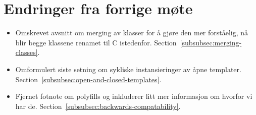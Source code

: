 
\chapter*{Endringer fra forrige møte}

\begin{itemize}
    \item Omskrevet avsnitt om merging av klasser for å gjøre den mer forståelig, nå blir begge klassene renamet til C istedenfor.
    Section~\vref{subsubsec:merging-classes}.
    \item Omformulert siste setning om sykliske instansieringer av åpne templater.
    Section~\vref{subsubsec:open-and-closed-templates}.
    \item Fjernet fotnote om polyfills og inkluderer litt mer informasjon om hvorfor vi har de.
    Section~\vref{subsubsec:backwards-compatability}.
\end{itemize}

